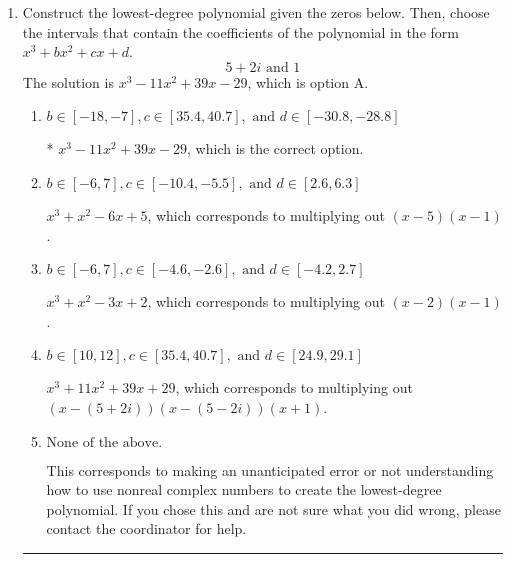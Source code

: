 \documentclass{extbook}[14pt]
\newcommand{\litem}[1]{\item #1

\rule{\textwidth}{0.4pt}}
\begin{document}
\begin{enumerate}\litem{
Construct the lowest-degree polynomial given the zeros below. Then, choose the intervals that contain the coefficients of the polynomial in the form $x^3+bx^2+cx+d$.
\[ 5 + 2 i \text{ and } 1 \]The solution is \( x^{3} -11 x^{2} +39 x -29 \), which is option A.\begin{enumerate}[label=\Alph*.]
\item \( b \in [-18, -7], c \in [35.4, 40.7], \text{ and } d \in [-30.8, -28.8] \)

* $x^{3} -11 x^{2} +39 x -29$, which is the correct option.
\item \( b \in [-6, 7], c \in [-10.4, -5.5], \text{ and } d \in [2.6, 6.3] \)

$x^{3} + x^{2} -6 x + 5$, which corresponds to multiplying out $(x -5)(x -1)$.
\item \( b \in [-6, 7], c \in [-4.6, -2.6], \text{ and } d \in [-4.2, 2.7] \)

$x^{3} + x^{2} -3 x + 2$, which corresponds to multiplying out $(x -2)(x -1)$.
\item \( b \in [10, 12], c \in [35.4, 40.7], \text{ and } d \in [24.9, 29.1] \)

$x^{3} +11 x^{2} +39 x + 29$, which corresponds to multiplying out $(x-(5 + 2 i))(x-(5 - 2 i))(x + 1)$.
\item \( \text{None of the above.} \)

This corresponds to making an unanticipated error or not understanding how to use nonreal complex numbers to create the lowest-degree polynomial. If you chose this and are not sure what you did wrong, please contact the coordinator for help.
\end{enumerate}

}
\end{enumerate}
\end{document}

